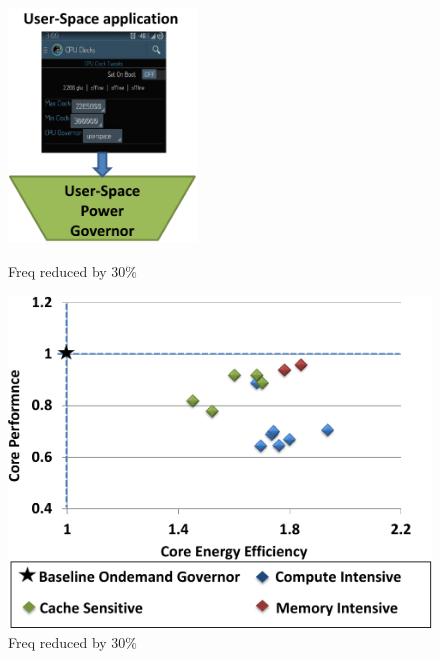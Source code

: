 \begin{figure}[h]
  \begin{center}
\includegraphics[width=5cm,height=7cm]{figs/user-space-crop.pdf}
  \end{center}
  \vspace{-0.1in}
  \caption{Freq reduced by 30\%}
	\label{fig:reduce-freq}
\end{figure}

\begin{figure}[h]
  \begin{center}
\includegraphics[width=\linewidth]{figs/ana-reduce-crop.pdf}
  \end{center}
  \vspace{-0.1in}
  \caption{Freq reduced by 30\%}
	\label{fig:reduce-freq}
\end{figure}


